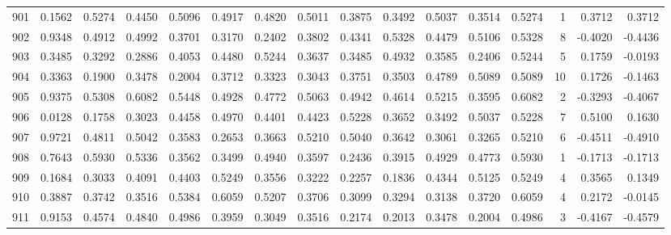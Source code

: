 \begin{tabular}{lrrrrrrrrrrrrrrr}
901 &      0.1562 &  0.5274 &  0.4450 &  0.5096 &  0.4917 &  0.4820 &  0.5011 &  0.3875 &  0.3492 &  0.5037 &   0.3514 &     0.5274 &      1 &                    0.3712 &                     0.3712 \\
902 &      0.9348 &  0.4912 &  0.4992 &  0.3701 &  0.3170 &  0.2402 &  0.3802 &  0.4341 &  0.5328 &  0.4479 &   0.5106 &     0.5328 &      8 &                   -0.4020 &                    -0.4436 \\
903 &      0.3485 &  0.3292 &  0.2886 &  0.4053 &  0.4480 &  0.5244 &  0.3637 &  0.3485 &  0.4932 &  0.3585 &   0.2406 &     0.5244 &      5 &                    0.1759 &                    -0.0193 \\
904 &      0.3363 &  0.1900 &  0.3478 &  0.2004 &  0.3712 &  0.3323 &  0.3043 &  0.3751 &  0.3503 &  0.4789 &   0.5089 &     0.5089 &     10 &                    0.1726 &                    -0.1463 \\
905 &      0.9375 &  0.5308 &  0.6082 &  0.5448 &  0.4928 &  0.4772 &  0.5063 &  0.4942 &  0.4614 &  0.5215 &   0.3595 &     0.6082 &      2 &                   -0.3293 &                    -0.4067 \\
906 &      0.0128 &  0.1758 &  0.3023 &  0.4458 &  0.4970 &  0.4401 &  0.4423 &  0.5228 &  0.3652 &  0.3492 &   0.5037 &     0.5228 &      7 &                    0.5100 &                     0.1630 \\
907 &      0.9721 &  0.4811 &  0.5042 &  0.3583 &  0.2653 &  0.3663 &  0.5210 &  0.5040 &  0.3642 &  0.3061 &   0.3265 &     0.5210 &      6 &                   -0.4511 &                    -0.4910 \\
908 &      0.7643 &  0.5930 &  0.5336 &  0.3562 &  0.3499 &  0.4940 &  0.3597 &  0.2436 &  0.3915 &  0.4929 &   0.4773 &     0.5930 &      1 &                   -0.1713 &                    -0.1713 \\
909 &      0.1684 &  0.3033 &  0.4091 &  0.4403 &  0.5249 &  0.3556 &  0.3222 &  0.2257 &  0.1836 &  0.4344 &   0.5125 &     0.5249 &      4 &                    0.3565 &                     0.1349 \\
910 &      0.3887 &  0.3742 &  0.3516 &  0.5384 &  0.6059 &  0.5207 &  0.3706 &  0.3099 &  0.3294 &  0.3138 &   0.3720 &     0.6059 &      4 &                    0.2172 &                    -0.0145 \\
911 &      0.9153 &  0.4574 &  0.4840 &  0.4986 &  0.3959 &  0.3049 &  0.3516 &  0.2174 &  0.2013 &  0.3478 &   0.2004 &     0.4986 &      3 &                   -0.4167 &                    -0.4579 \\

\end{tabular}
